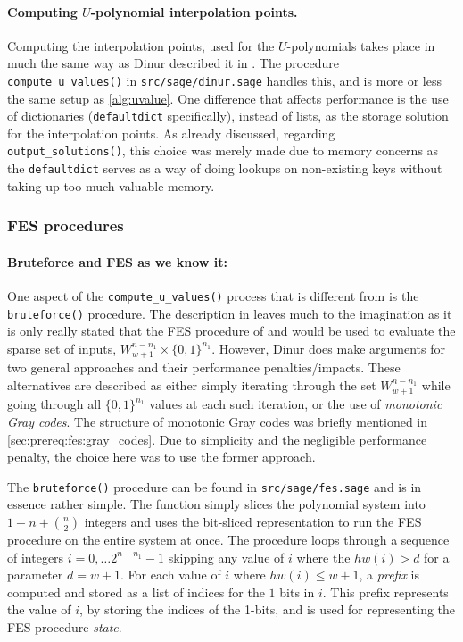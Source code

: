 \paragraph{Computing $U$-polynomial interpolation points.} Computing the interpolation points, used for the $U$-polynomials takes place in much the same way as Dinur described it in \cite{eurocrypt-2021-30841}. The procedure \texttt{compute\_u\_values()} in \texttt{src/sage/dinur.sage} handles this, and is more or less the same setup as \cref{alg:uvalue}. One difference that affects performance is the use of dictionaries (\texttt{defaultdict} specifically), instead of lists, as the storage solution for the interpolation points.
As already discussed, regarding \texttt{output\_solutions()}, this choice was merely made due to memory concerns as the \texttt{defaultdict} serves as a way of doing lookups on non-existing keys without taking up too much valuable memory.

\subsubsection{FES procedures} \label{sec:impl:fes}

\paragraph{Bruteforce and FES as we know it:} One aspect of the \texttt{compute\_u\_values()} process that is different from \cite{eurocrypt-2021-30841} is the \texttt{bruteforce()} procedure. The description in \cite{eurocrypt-2021-30841} leaves much to the imagination as it is only really stated that the FES procedure of \cite{cryptoeprint:2013/436} and \cite{ches-2010-23990} would be used to evaluate the sparse set of inputs, $W^{n - n_1}_{w + 1} \times \{0,1\}^{n_1}$. However, Dinur does make arguments for two general approaches and their performance penalties/impacts. These alternatives are described as either simply iterating through the set $W^{n - n_1}_{w + 1}$ while going through all $\{0,1\}^{n_1}$ values at each such iteration, or the use of \textit{monotonic Gray codes}. The structure of monotonic Gray codes was briefly mentioned in \cref{sec:prereq:fes:gray_codes}. Due to simplicity and the negligible performance penalty, the choice here was to use the former approach. 

The \texttt{bruteforce()} procedure can be found in \texttt{src/sage/fes.sage} and is in essence rather simple. The function simply slices the polynomial system into $1 + n + \binom{n}{2}$ integers and uses the bit-sliced representation to run the FES procedure on the entire system at once. The procedure loops through a sequence of integers $i = 0, \dots 2^{n - n_1} - 1$ skipping any value of $i$ where the $hw(i) > d$ for a parameter $d = w + 1$. For each value of $i$ where $hw(i) \leq w + 1$, a \textit{prefix} is computed and stored as a list of indices for the $1$ bits in $i$.
This prefix represents the value of $i$, by storing the indices of the 1-bits, and is used for representing the FES procedure \textit{state}.

